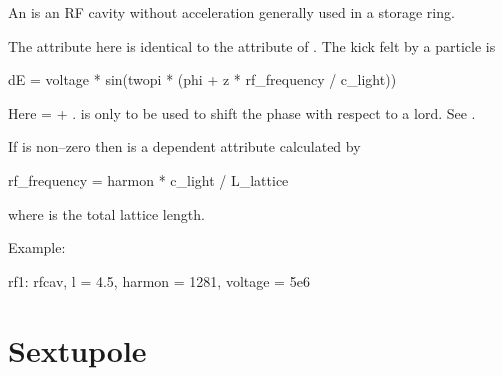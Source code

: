 {{An  is an RF cavity without acceleration generally used
in a storage ring.

The  attribute here is identical to the  attribute of
\mad. The kick felt by a particle is 
\begin{example}
  dE = voltage * sin(twopi * (phi + z * rf_frequency / c_light))
\end{example}
Here  =  + . 
is only to be used to shift the phase with respect to a 
lord. See .

If  is non--zero then  is a dependent
attribute calculated by
\begin{example}
  rf_frequency = harmon * c_light / L_lattice 
\end{example}
where  is the total lattice length.

Example:
\begin{example}
  rf1: rfcav, l = 4.5, harmon = 1281, voltage = 5e6
\end{example}

\section{Sextupole}
\label{s:sex}

}}
